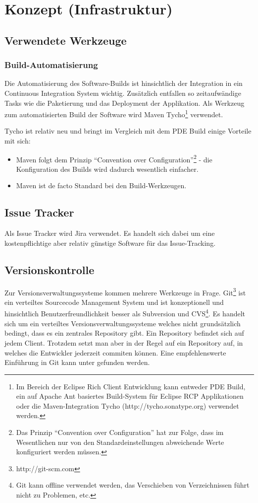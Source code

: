 \chapter{Konzept (Infrastruktur)}\label{konzept_3}
\section{Verwendete Werkzeuge}
\subsection{Build-Automatisierung}
Die Automatisierung des Software-Builds ist hinsichtlich der Integration in ein Continuous Integration System wichtig. Zusätzlich entfallen so zeitaufwändige Tasks wie die Paketierung und das Deployment der Applikation.
Als Werkzeug zum automatisierten Build der Software wird Maven Tycho\footnote{Im Bereich der Eclipse Rich Client Entwicklung kann entweder PDE Build, ein auf Apache Ant basiertes Build-System für Eclipse RCP Applikationen\cite{vogelZapfPdeBuild} oder die Maven-Integration Tycho (http://tycho.sonatype.org) verwendet werden.} verwendet.

Tycho ist relativ neu und bringt im Vergleich mit dem PDE Build einige Vorteile mit sich:
\begin{itemize}
	\item Maven folgt dem Prinzip ``Convention over Configuration''\footnote{Das Prinzip ``Convention over Configuration'' hat zur Folge, dass im Wesentlichen nur von den Standardeinstellungen abweichende Werte konfiguriert werden müssen.} - die Konfiguration des Builds wird dadurch wesentlich einfacher.
	\item Maven ist de facto Standard bei den Build-Werkzeugen.
\end{itemize}

\section{Issue Tracker}\label{issue_tracker}
Als Issue Tracker wird Jira verwendet. Es handelt sich dabei um eine kostenpflichtige aber relativ günstige Software für das Issue-Tracking.

\section{Versionskontrolle}
Zur Versionsverwaltungssysteme kommen mehrere Werkzeuge in Frage. Git\footnote{http://git-scm.com} ist ein verteiltes Sourcecode Management System und ist konzeptionell und hinsichtlich Benutzerfreundlichkeit besser als Subversion und CVS\footnote{Git kann offline verwendet werden, das Verschieben von Verzeichnissen führt nicht zu Problemen, etc.}. Es handelt sich um ein verteiltes Versionsverwaltungssysteme welches nicht grundsätzlich bedingt, dass es ein zentrales Repository gibt. Ein Repository befindet sich auf jedem Client. Trotzdem setzt man aber in der Regel auf ein Repository auf, in welches die Entwickler jederzeit commiten können. Eine empfehlenswerte Einführung in Git kann unter \cite{dilger201111}  gefunden werden.

